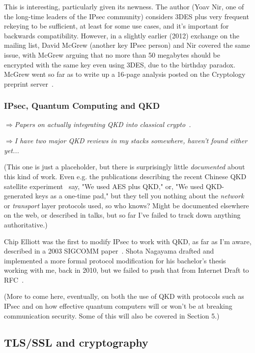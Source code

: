 \documentclass[%
 aip,
 jmp,%
 amsmath,amssymb,
 reprint,%
]{revtex4-1}
\def\comment#1{{\color{ForestGreen}$\Rightarrow${\small\em #1}}}
\begin{document}
This is interesting, particularly given its newness.  The author (Yoav
Nir, one of the long-time leaders of the IPsec community) considers
3DES plus very frequent rekeying to be sufficient, at least for some use
cases, and it's important for backwards compatibility.  However, in a
slightly earlier (2012) exchange on the mailing list, David McGrew
(another key IPsec person) and Nir covered the same issue, with McGrew
arguing that no more than 50 megabytes should be encrypted with the
same key even using 3DES, due to the birthday paradox.  McGrew went so
far as to write up a 16-page analysis posted on the Cryptology
preprint server~\cite{cryptoeprint:2012:623}.

\subsubsection{IPsec, Quantum Computing and QKD}

\comment{Papers on actually integrating QKD into classical crypto~\cite{Alleaume201462,mink09:_qkd_and_ipsec}.}

\comment{I have two major QKD reviews in my stacks somewhere, haven't
  found either yet...}

(This one is just a placeholder, but there is surprisingly little
\emph{documented} about this kind of work.  Even e.g. the publications
describing the recent Chinese QKD satellite
experiment~\cite{PhysRevLett.120.030501} say, "We used AES plus QKD,"
or, "We used QKD-generated keys as a one-time pad," but they tell you
nothing about the \emph{network} or \emph{transport} layer protocols
used, so who knows?  Might be documented elsewhere on the web, or
described in talks, but so far I've failed to track down anything
authoritative.)

Chip Elliott was the first to modify IPsec to work with QKD, as far as
I'm aware, described in a 2003 SIGCOMM paper~\cite{elliott:qkd-net}.
Shota Nagayama drafted and implemented a more formal protocol
modification for his bachelor's thesis working with me, back in 2010,
but we failed to push that from Internet Draft to
RFC~\cite{nagayama12:_ike_for_ipsec_with_qkd}.

(More to come here, eventually, on both the use of QKD with protocols
such as IPsec and on how effective quantum computers will or won't be
at breaking communication security.  Some of this will also be covered
in Section 5.)

\subsection{TLS/SSL and cryptography}
\label{sec:tls}
\end{document}
